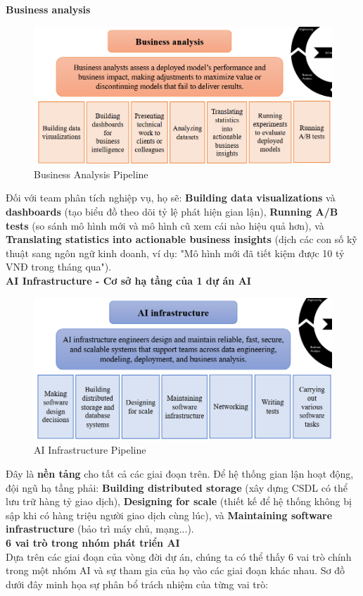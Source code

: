 \documentclass[11pt]{article}
\begin{document}
\noindent \textbf{Business analysis}
\begin{figure}[H]
    \centering
    \includegraphics[width=0.8\linewidth]{images/business_analysis.png}
    \caption{Business Analysis Pipeline}
\end{figure}
Đối với team phân tích nghiệp vụ, họ sẽ: \textbf{Building data visualizations} và \textbf{dashboards} (tạo biểu đồ theo dõi tỷ lệ phát hiện gian lận), \textbf{Running A/B tests} (so sánh mô hình mới và mô hình cũ xem cái nào hiệu quả hơn), và \textbf{Translating statistics into actionable business insights} (dịch các con số kỹ thuật sang ngôn ngữ kinh doanh, ví dụ: "Mô hình mới đã tiết kiệm được 10 tỷ VNĐ trong tháng qua"). \\

\noindent \textbf{AI Infrastructure - Cơ sở hạ tầng của 1 dự án AI}
\begin{figure}[H]
    \centering
    \includegraphics[width=0.8\linewidth]{images/ai_infra.png}
    \caption{AI Infrastructure Pipeline}
\end{figure}
Đây là \textbf{nền tảng} cho tất cả các giai đoạn trên. Để hệ thống gian lận hoạt động, đội ngũ hạ tầng phải: \textbf{Building distributed storage} (xây dựng CSDL có thể lưu trữ hàng tỷ giao dịch), \textbf{Designing for scale} (thiết kế để hệ thống không bị sập khi có hàng triệu người giao dịch cùng lúc), và \textbf{Maintaining software infrastructure} (bảo trì máy chủ, mạng...). \\

\noindent \textbf{6 vai trò trong nhóm phát triển AI} \\
Dựa trên các giai đoạn của vòng đời dự án, chúng ta có thể thấy 6 vai trò chính trong một nhóm AI và sự tham gia của họ vào các giai đoạn khác nhau. Sơ đồ dưới đây minh họa sự phân bổ trách nhiệm của từng vai trò:
\end{document}
